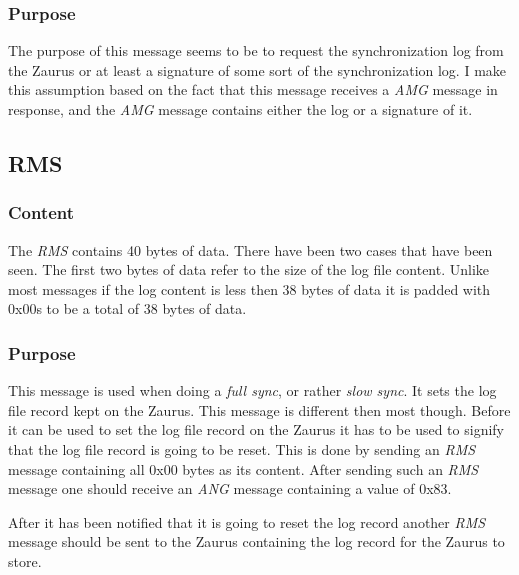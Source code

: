             \subsubsection{Purpose}

            The purpose of this message seems to be to request the
            synchronization log from the Zaurus or at least a signature of some
            sort of the synchronization log. I make this assumption based on
            the fact that this message receives a \emph{AMG} message in
            response, and the \emph{AMG} message contains either the log or a
            signature of it.

        \subsection{RMS}

            \subsubsection{Content}

            The \emph{RMS} contains 40 bytes of data. There have been two
            cases that have been seen. The first two bytes of data refer to
            the size of the log file content. Unlike most messages if the log
            content is less then 38 bytes of data it is padded with 0x00s to
            be a total of 38 bytes of data.
            
            \subsubsection{Purpose}

            This message is used when doing a \emph{full sync}, or rather
            \emph{slow sync}. It sets the log file record kept on the
            Zaurus. This message is different then most though. Before it can
            be used to set the log file record on the Zaurus it has to be used
            to signify that the log file record is going to be reset. This is
            done by sending an \emph{RMS} message containing all 0x00 bytes as
            its content. After sending such an \emph{RMS} message one should
            receive an \emph{ANG} message containing a value of 0x83.

            After it has been notified that it is going to reset the log
            record another \emph{RMS} message should be sent to the Zaurus
            containing the log record for the Zaurus to store.

